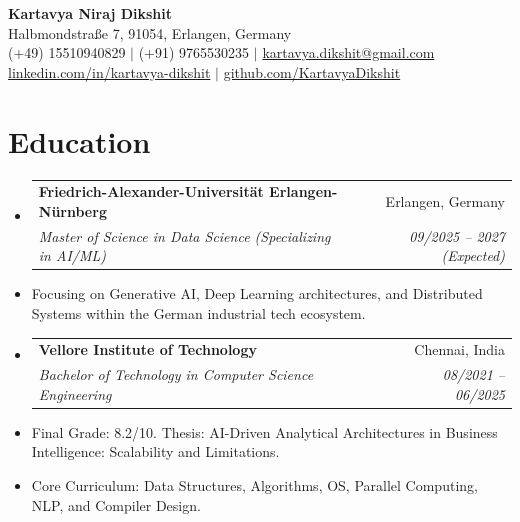 \documentclass[10pt, a4paper]{article}
\makeatletter
\newcommand{\resumeItem}[1]{\item\small{#1}}
\newcommand{\resumeHeading}[4]{
  \vspace{-1pt}\item
    \begin{tabular*}{0.97\textwidth}[t]{l@{\extracolsep{\fill}}r}
      \textbf{#1} & #2 \\
      \textit{\small#3} & \textit{\small #4} \\
    \end{tabular*}\vspace{-5pt}
}
\makeatother
\begin{document}
\begin{center}
    {\Huge \textbf{\color{primarycolor} Kartavya Niraj Dikshit}} \\
    \vspace{4pt}
    Halbmondstraße 7, 91054, Erlangen, Germany \\
    \small (+49) 15510940829 $|$ (+91) 9765530235 $|$ \href{mailto:kartavya.dikshit@gmail.com}{kartavya.dikshit@gmail.com} \\
    \href{http://www.linkedin.com/in/kartavya-dikshit}{linkedin.com/in/kartavya-dikshit} $|$ \href{https://github.com/KartavyaDikshit}{github.com/KartavyaDikshit}
\end{center}

\section{Education}
\begin{itemize}[leftmargin=0.15in, label={}]
    \resumeHeading
      {Friedrich-Alexander-Universität Erlangen-Nürnberg}{Erlangen, Germany}
      {Master of Science in Data Science (Specializing in AI/ML)}{09/2025 -- 2027 (Expected)}
      \resumeItem{Focusing on Generative AI, Deep Learning architectures, and Distributed Systems within the German industrial tech ecosystem.}
    
    \resumeHeading
      {Vellore Institute of Technology}{Chennai, India}
      {Bachelor of Technology in Computer Science Engineering}{08/2021 -- 06/2025}
      \resumeItem{Final Grade: 8.2/10. Thesis: AI-Driven Analytical Architectures in Business Intelligence: Scalability and Limitations.}
      \resumeItem{Core Curriculum: Data Structures, Algorithms, OS, Parallel Computing, NLP, and Compiler Design.}
\end{itemize}

\end{document}
